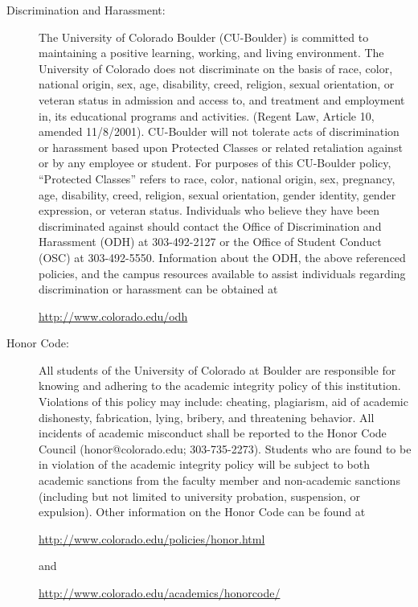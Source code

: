 \documentclass[11pt]{article}
\begin{document}
\begin{description}
\item[Discrimination and Harassment:] The University of Colorado
  Boulder (CU-Boulder) is committed to maintaining a positive
  learning, working, and living environment. The University of
  Colorado does not discriminate on the basis of race, color, national
  origin, sex, age, disability, creed, religion, sexual orientation,
  or veteran status in admission and access to, and treatment and
  employment in, its educational programs and activities. (Regent Law,
  Article 10, amended 11/8/2001).  CU-Boulder will not tolerate acts
  of discrimination or harassment based upon Protected Classes or
  related retaliation against or by any employee or student. For
  purposes of this CU-Boulder policy, ``Protected Classes'' refers to
  race, color, national origin, sex, pregnancy, age, disability,
  creed, religion, sexual orientation, gender identity, gender
  expression, or veteran status.  Individuals who believe they have
  been discriminated against should contact the Office of
  Discrimination and Harassment (ODH) at 303-492-2127 or the Office of
  Student Conduct (OSC) at 303-492-5550.  Information about the ODH,
  the above referenced policies, and the campus resources available to
  assist individuals regarding discrimination or harassment can be
  obtained at
  \begin{center}
    \url{http://www.colorado.edu/odh}
  \end{center}

\item[Honor Code:] All students of the University of Colorado at
  Boulder are responsible for knowing and adhering to the academic
  integrity policy of this institution.  Violations of this policy may
  include: cheating, plagiarism, aid of academic dishonesty,
  fabrication, lying, bribery, and threatening behavior.  All
  incidents of academic misconduct shall be reported to the Honor Code
  Council (honor@colorado.edu; 303-735-2273). Students who are found
  to be in violation of the academic integrity policy will be subject
  to both academic sanctions from the faculty member and non-academic
  sanctions (including but not limited to university probation,
  suspension, or expulsion). Other information on the Honor Code can
  be found at 
  \begin{center}
    \url{http://www.colorado.edu/policies/honor.html}
  \end{center}
  and
  \begin{center}
    \url{http://www.colorado.edu/academics/honorcode/}
  \end{center}
\end{description}
\end{document}
